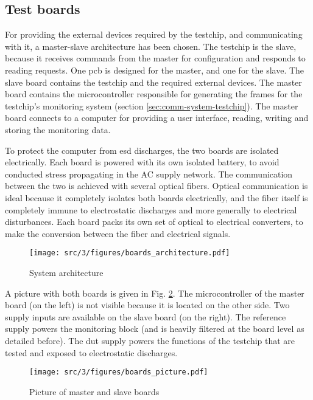 \subsection{Test boards}

For providing the external devices required by the testchip, and communicating with it, a master-slave architecture has been chosen.
The testchip is the slave, because it receives commands from the master for configuration and responds to reading requests.
One \gls{pcb} is designed for the master, and one for the slave.
The slave board contains the testchip and the required external devices.
The master board contains the microcontroller responsible for generating the frames for the testchip's monitoring system (section \ref{sec:comm-system-testchip}).
The master board connects to a computer for providing a user interface, reading, writing and storing the monitoring data.

To protect the computer from \gls{esd} discharges, the two boards are isolated electrically.
Each board is powered with its own isolated battery, to avoid conducted stress propagating in the AC supply network.
The communication between the two is achieved with several optical fibers.
Optical communication is ideal because it completely isolates both boards electrically, and the fiber itself is completely immune to electrostatic discharges and more generally to electrical disturbances.
Each board packs its own set of optical to electrical converters, to make the conversion between the fiber and electrical signals.

\begin{figure}[!h]
  \centering
  \texttt{[image: src/3/figures/boards\_architecture.pdf]}
  \caption{System architecture}
  \label{fig:system-board-architecture}
\end{figure}

A picture with both boards is given in Fig. \ref{fig:system-board-pictures}.
The microcontroller of the master board (on the left) is not visible because it is located on the other side.
Two supply inputs are available on the slave board (on the right).
The reference supply powers the monitoring block (and is heavily filtered at the board level as detailed before).
The dut supply powers the functions of the testchip that are tested and exposed to electrostatic discharges.

\begin{figure}[!h]
  \centering
  \texttt{[image: src/3/figures/boards\_picture.pdf]}
  \caption{Picture of master and slave boards}
  \label{fig:system-board-pictures}
\end{figure}
